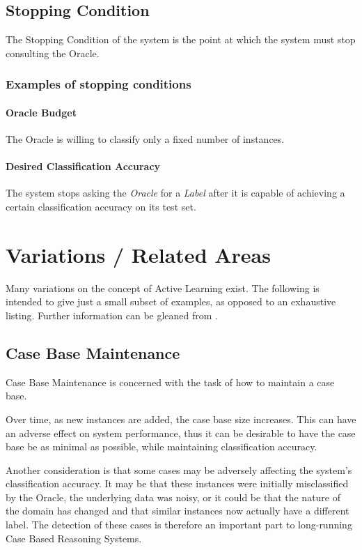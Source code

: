 \documentclass[a4paper,11pt]{report}
\begin{document}
\subsection{Stopping Condition}
The Stopping Condition of the system is the point at which the system must stop consulting the Oracle.

\subsubsection{Examples of stopping conditions}
\paragraph{Oracle Budget} 
The Oracle is willing to classify only a fixed number of instances.

\paragraph{Desired Classification Accuracy} 
The system stops asking the \emph{Oracle} for a \emph{Label} after it is capable of achieving a certain classification accuracy on its test set.

\section{Variations / Related Areas}
Many variations on the concept of Active Learning exist. The following is intended to give just a small subset of examples, as opposed to an exhaustive listing. Further information can be gleaned from \citep{Settles2010}.

\subsection{Case Base Maintenance}
Case Base Maintenance is concerned with the task of how to maintain a case base. 

Over time, as new instances are added, the case base size increases. This can have an adverse effect on system performance, thus it can be desirable to have the case base be as minimal as possible, while maintaining classification accuracy.

Another consideration is that some cases may be adversely affecting the system's classification accuracy. It may be that these instances were initially misclassified by the Oracle, the underlying data was noisy, or it could be that the nature of the domain has changed and that similar instances now actually have a different label. The detection of these cases is therefore an important part to long-running Case Based Reasoning Systems.
\end{document}
